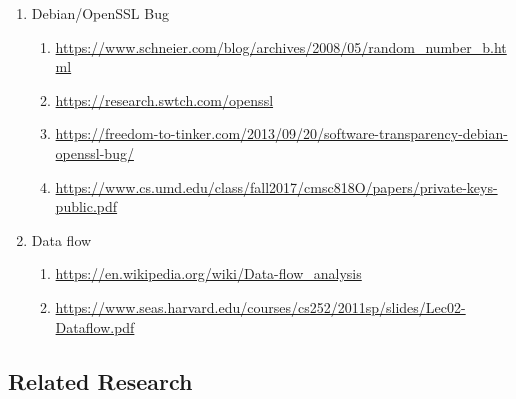 \documentclass[letterpaper,twocolumn,10pt]{article}
\begin{document}
\begin{enumerate}
	\item Debian/OpenSSL Bug 
		\begin{enumerate}
			\item \url{https://www.schneier.com/blog/archives/2008/05/random_number_b.html}
			\item \url{https://research.swtch.com/openssl}
			\item \url{https://freedom-to-tinker.com/2013/09/20/software-transparency-debian-openssl-bug/}
			\item \url{https://www.cs.umd.edu/class/fall2017/cmsc818O/papers/private-keys-public.pdf}
		\end{enumerate}
	\item Data flow
		\begin{enumerate}
			\item \url{https://en.wikipedia.org/wiki/Data-flow_analysis}
			\item \url{https://www.seas.harvard.edu/courses/cs252/2011sp/slides/Lec02-Dataflow.pdf}
		\end{enumerate}
\end{enumerate}

\subsection{Related Research}

\end{document}
